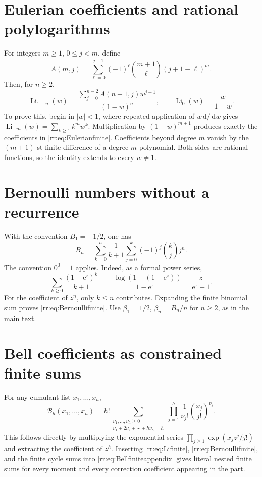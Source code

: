 \documentclass[11pt,a4paper,oneside,openany]{book}
\numberwithin{equation}{chapter}
\theoremstyle{definition}
\theoremstyle{remark}
\newcommand{\dd}{\,\mathrm d}
\newcommand{\e}{\mathrm e}
\DeclareMathOperator{\Li}{Li}
\newcommand{\B}{\mathcal B}
\begin{document}
\section{Eulerian coefficients and rational polylogarithms}
For integers \(m\geq1\), \(0\leq j<m\), define
\begin{equation}
 A(m,j)=\sum_{\ell=0}^{j+1}(-1)^\ell
                    \binom{m+1}{\ell}(j+1-\ell)^m.
 \label{rr:eq:Eulerianfinite}
\end{equation}
Then, for \(n\geq2\),
\begin{equation}
 \Li_{1-n}(w)=
 \frac{\displaystyle\sum_{j=0}^{n-2}A(n-1,j)w^{j+1}}{(1-w)^n},
 \qquad \Li_0(w)=\frac{w}{1-w}.
 \label{rr:eq:Lifinite}
\end{equation}
To prove this, begin in \(|w|<1\), where repeated application of \(w\dd/\dd w\) gives \(\Li_{-m}(w)=\sum_{k\geq1}k^mw^k\). Multiplication by \((1-w)^{m+1}\) produces exactly the coefficients in \eqref{rr:eq:Eulerianfinite}. Coefficients beyond degree \(m\) vanish by the \((m+1)\)-st finite difference of a degree-\(m\) polynomial. Both sides are rational functions, so the identity extends to every \(w\ne1\).

\section{Bernoulli numbers without a recurrence}
With the convention \(B_1=-1/2\), one has
\begin{equation}
 B_n=\sum_{k=0}^n\frac1{k+1}\sum_{j=0}^k(-1)^j\binom{k}{j}j^n.
 \label{rr:eq:Bernoullifinite}
\end{equation}
The convention \(0^0=1\) applies. Indeed, as a formal power series,
\[
 \sum_{k\geq0}\frac{(1-\e^z)^k}{k+1}
 =\frac{-\log(1-(1-\e^z))}{1-\e^z}
 =\frac{z}{\e^z-1}.
\]
For the coefficient of \(z^n\), only \(k\leq n\) contributes. Expanding the finite binomial sum proves \eqref{rr:eq:Bernoullifinite}. Use \(\beta_1=1/2\), \(\beta_n=B_n/n\) for \(n\geq2\), as in the main text.

\section{Bell coefficients as constrained finite sums}
For any cumulant list \(x_1,\ldots,x_h\),
\begin{equation}
 \B_h(x_1,\ldots,x_h)
 =h!\sum_{\substack{\nu_1,\ldots,\nu_h\geq0\\
                         \nu_1+2\nu_2+\cdots+h\nu_h=h}}
         \prod_{j=1}^h\frac1{\nu_j!}
                              \left(\frac{x_j}{j!}\right)^{\nu_j}.
 \label{rr:eq:Bellfiniteappendix}
\end{equation}
This follows directly by multiplying the exponential series
\(\prod_{j\geq1}\exp(x_jz^j/j!)\) and extracting the coefficient of \(z^h\). Inserting \eqref{rr:eq:Lifinite}, \eqref{rr:eq:Bernoullifinite}, and the finite cycle sums into \eqref{rr:eq:Bellfiniteappendix} gives literal nested finite sums for every moment and every correction coefficient appearing in the part.
\end{document}
